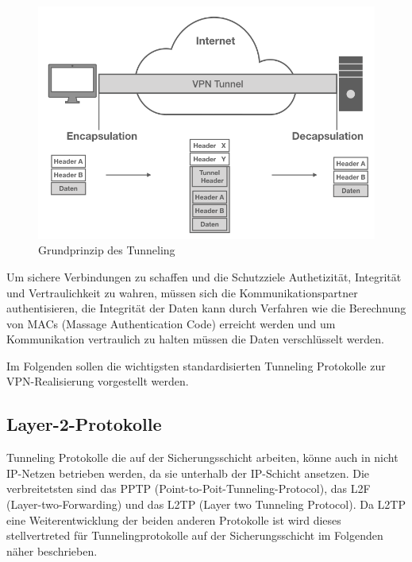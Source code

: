 \begin{figure}[h]
	\includegraphics[width=\linewidth]{tunneling}
	\caption{Grundprinzip des Tunneling}
	\label{tunnel}
\end{figure}

Um sichere Verbindungen zu schaffen und die Schutzziele Authetizität, Integrität und Vertraulichkeit zu wahren, müssen sich die Kommunikationspartner authentisieren, die Integrität der Daten kann durch Verfahren wie die Berechnung von MACs (Massage Authentication Code) erreicht werden und um Kommunikation vertraulich zu halten müssen die Daten verschlüsselt werden.  

 Im Folgenden sollen die wichtigsten standardisierten  Tunneling Protokolle zur VPN-Realisierung vorgestellt werden.
 

\subsection{Layer-2-Protokolle}
Tunneling Protokolle die auf der Sicherungsschicht arbeiten, könne auch in nicht IP-Netzen betrieben werden, da sie unterhalb der IP-Schicht ansetzen. Die verbreitetsten sind das PPTP (Point-to-Poit-Tunneling-Protocol), das L2F  (Layer-two-Forwarding) und das L2TP (Layer two Tunneling Protocol). Da L2TP eine Weiterentwicklung der beiden anderen Protokolle ist \cite{lipp2007vpn} wird dieses stellvertreted für Tunnelingprotokolle auf der Sicherungsschicht im Folgenden näher beschrieben.


